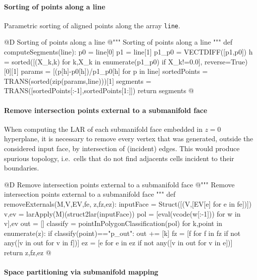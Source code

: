 \documentclass[11pt,oneside]{article}    %
\begin{document}
\paragraph{Sorting of points along a line}

Parametric sorting of aligned points along the array \texttt{line}. 

@D Sorting of points along a line
@{""" Sorting of points along a line """
def computeSegments(line):
    p0 = line[0]
    p1 = line[1]
    p1_p0 = VECTDIFF([p1,p0])
    h = sorted([(X_k,k) for k,X_k in enumerate(p1_p0) if X_k!=0.0], reverse=True)[0][1]
    params = [(p[h]-p0[h])/p1_p0[h] for p in line]
    sortedPoints = TRANS(sorted(zip(params,line)))[1]
    segments = TRANS([sortedPoints[:-1],sortedPoints[1:]])
    return segments
@}


\paragraph{Remove intersection points external to a submanifold face}
When computing the LAR of each submanifold face embedded in $z=0$ hyperplane, it is necessary
to remove every vertex that was generated, outside the considered input face, by intersection of (incident) edges. This would produce spurious topology, i.e.~cells that do not find adjacents cells incident to their boundaries.

@D Remove intersection points external to a submanifold face
@{""" Remove intersection points external to a submanifold face """
def removeExternals(M,V,EV,fe, z,fz,ez):
    inputFace = Struct([(V,[EV[e] for e in fe])])
    v,ev = larApply(M)(struct2lar(inputFace))
    pol = [eval(vcode(w[:-1])) for w in v],ev
    out = []
    classify = pointInPolygonClassification(pol)
    for k,point in enumerate(z):
        if classify(point)=="p_out":  out += [k]
    fz = [f for f in fz if not any([v in out for v in f])]
    ez = [e for e in ez if not any([v in out for v in e])]
    return z,fz,ez
@}

\paragraph{Space partitioning via submanifold mapping}
\end{document}
